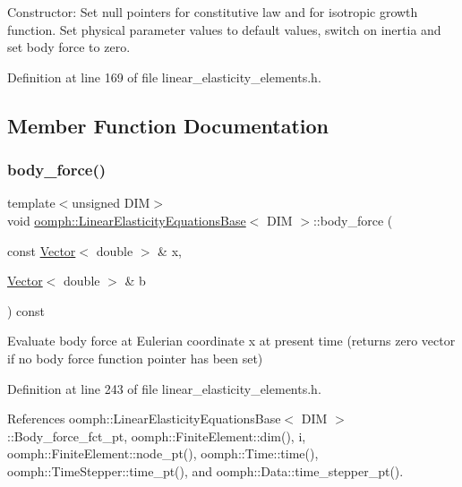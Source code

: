 Constructor\+: Set null pointers for constitutive law and for isotropic growth function. Set physical parameter values to default values, switch on inertia and set body force to zero. 



Definition at line 169 of file linear\+\_\+elasticity\+\_\+elements.\+h.



\subsection{Member Function Documentation}
\mbox{\label{classoomph_1_1LinearElasticityEquationsBase_a6d1d79dd1b1dcd159f573a81b6569bfa}} 
\subsubsection{\texorpdfstring{body\+\_\+force()}{body\_force()}}
{\footnotesize\ttfamily template$<$unsigned D\+IM$>$ \\
void \hyperlink{classoomph_1_1LinearElasticityEquationsBase}{oomph\+::\+Linear\+Elasticity\+Equations\+Base}$<$ D\+IM $>$\+::body\+\_\+force (\begin{DoxyParamCaption}\item[{const \hyperlink{classoomph_1_1Vector}{Vector}$<$ double $>$ \&}]{x,  }\item[{\hyperlink{classoomph_1_1Vector}{Vector}$<$ double $>$ \&}]{b }\end{DoxyParamCaption}) const\hspace{0.3cm}{\ttfamily [inline]}}



Evaluate body force at Eulerian coordinate x at present time (returns zero vector if no body force function pointer has been set) 



Definition at line 243 of file linear\+\_\+elasticity\+\_\+elements.\+h.



References oomph\+::\+Linear\+Elasticity\+Equations\+Base$<$ D\+I\+M $>$\+::\+Body\+\_\+force\+\_\+fct\+\_\+pt, oomph\+::\+Finite\+Element\+::dim(), i, oomph\+::\+Finite\+Element\+::node\+\_\+pt(), oomph\+::\+Time\+::time(), oomph\+::\+Time\+Stepper\+::time\+\_\+pt(), and oomph\+::\+Data\+::time\+\_\+stepper\+\_\+pt().

